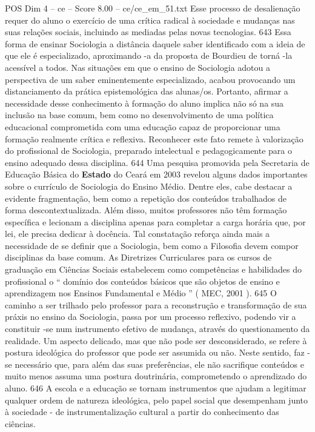 \begin{textsample}{POS Dim 4 – ce – Score 8.00 – ce/ce\_em\_51.txt}
Esse processo de desalienação requer do aluno o exercício de uma crítica radical à sociedade e mudanças nas suas relações sociais, incluindo as mediadas pelas novas tecnologias. 643 Essa forma de ensinar Sociologia a distância daquele saber identificado com a ideia de que ele é especializado, aproximando -a da proposta de Bourdieu de torná -la acessível a todos.
Nas situações em que o ensino de Sociologia adotou a perspectiva de um saber eminentemente especializado, acabou provocando um distanciamento da prática epistemológica das alunas/os.
Portanto, afirmar a necessidade desse conhecimento à formação do aluno implica não só na sua inclusão na base comum, bem como no desenvolvimento de uma política educacional comprometida com uma educação capaz de proporcionar uma formação realmente crítica e reflexiva.
Reconhecer este fato remete à valorização do profissional de Sociologia, preparado intelectual e pedagogicamente para o ensino adequado dessa disciplina. 644 Uma pesquisa promovida pela Secretaria de Educação Básica do \textbf{Estado} do Ceará em 2003 revelou alguns dados importantes sobre o currículo de Sociologia do Ensino Médio.
Dentre eles, cabe destacar a evidente fragmentação, bem como a repetição dos conteúdos trabalhados de forma descontextualizada.
Além disso, muitos professores não têm formação específica e lecionam a disciplina apenas para completar a carga horária que, por lei, ele precisa dedicar à docência.
Tal constatação reforça ainda mais a necessidade de se definir que a Sociologia, bem como a Filosofia devem compor disciplinas da base comum.
As Diretrizes Curriculares para os cursos de graduação em Ciências Sociais estabelecem como competências e habilidades do profissional o “ domínio dos conteúdos básicos que são objetos de ensino e aprendizagem nos Ensinos Fundamental e Médio ” ( MEC, 2001 ). 645 O caminho a ser trilhado pelo professor para a reconstrução e transformação de sua práxis no ensino da Sociologia, passa por um processo reflexivo, podendo vir a constituir -se num instrumento efetivo de mudança, através do questionamento da realidade.
Um aspecto delicado, mas que não pode ser desconsiderado, se refere à postura ideológica do professor que pode ser assumida ou não.
Neste sentido, faz -se necessário que, para além das suas preferências, ele não sacrifique conteúdos e muito menos assuma uma postura doutrinária, comprometendo o aprendizado do aluno. 646 A escola e a educação se tornam instrumentos que ajudam a legitimar qualquer ordem de natureza ideológica, pelo papel social que desempenham junto à sociedade - de instrumentalização cultural a partir do conhecimento das ciências.

\end{textsample}
